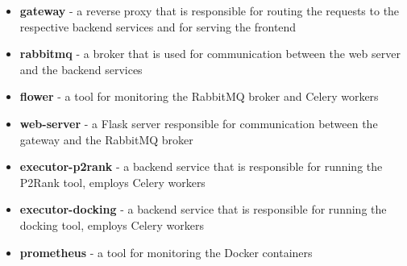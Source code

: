\begin{itemize}
    \item \textbf{gateway} - a reverse proxy that is responsible for routing the requests to the respective backend services and for serving the frontend
    \item \textbf{rabbitmq} - a broker that is used for communication between the web server and the backend services
    \item \textbf{flower} - a tool for monitoring the RabbitMQ broker and Celery workers
    \item \textbf{web-server} - a Flask server responsible for communication between the gateway and the RabbitMQ broker
    \item \textbf{executor-p2rank} - a backend service that is responsible for running the P2Rank tool, employs Celery workers
    \item \textbf{executor-docking} - a backend service that is responsible for running the docking tool, employs Celery workers
    \item \textbf{prometheus} - a tool for monitoring the Docker containers 
\end{itemize}

